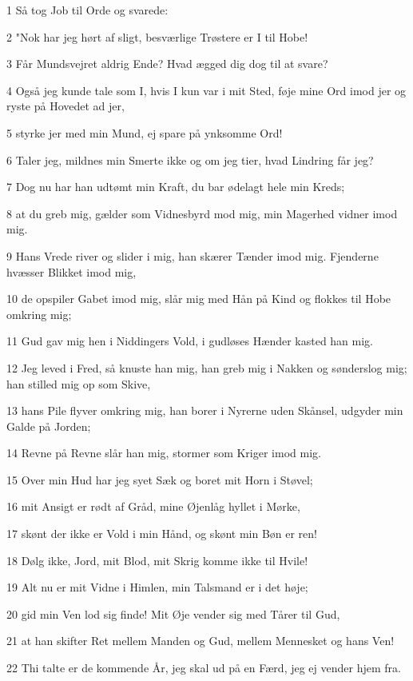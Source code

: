 \par 1 Så tog Job til Orde og svarede:
\par 2 "Nok har jeg hørt af sligt, besværlige Trøstere er I til Hobe!
\par 3 Får Mundsvejret aldrig Ende? Hvad ægged dig dog til at svare?
\par 4 Også jeg kunde tale som I, hvis I kun var i mit Sted, føje mine Ord imod jer og ryste på Hovedet ad jer,
\par 5 styrke jer med min Mund, ej spare på ynksomme Ord!
\par 6 Taler jeg, mildnes min Smerte ikke og om jeg tier, hvad Lindring får jeg?
\par 7 Dog nu har han udtømt min Kraft, du bar ødelagt hele min Kreds;
\par 8 at du greb mig, gælder som Vidnesbyrd mod mig, min Magerhed vidner imod mig.
\par 9 Hans Vrede river og slider i mig, han skærer Tænder imod mig. Fjenderne hvæsser Blikket imod mig,
\par 10 de opspiler Gabet imod mig, slår mig med Hån på Kind og flokkes til Hobe omkring mig;
\par 11 Gud gav mig hen i Niddingers Vold, i gudløses Hænder kasted han mig.
\par 12 Jeg leved i Fred, så knuste han mig, han greb mig i Nakken og sønderslog mig; han stilled mig op som Skive,
\par 13 hans Pile flyver omkring mig, han borer i Nyrerne uden Skånsel, udgyder min Galde på Jorden;
\par 14 Revne på Revne slår han mig, stormer som Kriger imod mig.
\par 15 Over min Hud har jeg syet Sæk og boret mit Horn i Støvel;
\par 16 mit Ansigt er rødt af Gråd, mine Øjenlåg hyllet i Mørke,
\par 17 skønt der ikke er Vold i min Hånd, og skønt min Bøn er ren!
\par 18 Dølg ikke, Jord, mit Blod, mit Skrig komme ikke til Hvile!
\par 19 Alt nu er mit Vidne i Himlen, min Talsmand er i det høje;
\par 20 gid min Ven lod sig finde! Mit Øje vender sig med Tårer til Gud,
\par 21 at han skifter Ret mellem Manden og Gud, mellem Mennesket og hans Ven!
\par 22 Thi talte er de kommende År, jeg skal ud på en Færd, jeg ej vender hjem fra.

